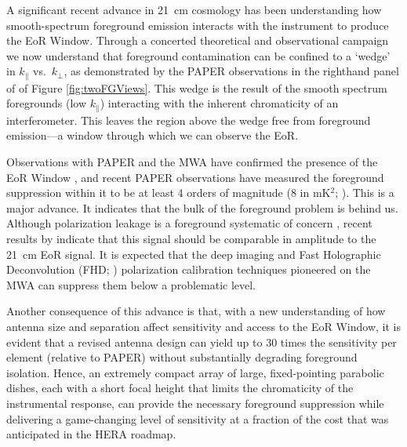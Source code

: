 \documentclass[preprint]{aastex}
\def\kperp{k_{\bot}}
\def\kpar{k_{\|}}
\begin{document}
A significant recent advance in 21~cm cosmology has been understanding how smooth-spectrum
foreground emission interacts with the instrument to produce the EoR Window.
Through a concerted theoretical and observational campaign
\citep{morales_et_al2012,parsons_et_al2012b,vedantham_2012,Datta_2010,hazelton_et_al2013,pober_et_al2013,parsons_et_al2013,dillon_et_al2013b_trunc}
we now understand that foreground contamination can be confined to a `wedge' in
$\kpar$ vs.\ $\kperp$, as demonstrated by the PAPER observations in the
righthand panel of of Figure \ref{fig:twoFGViews}. This wedge is the result of
the smooth spectrum foregrounds (low $\kpar$) interacting with the inherent
chromaticity of an interferometer. 
This leaves the region above the wedge free from 
foreground emission---a window through which we can observe the EoR.

Observations with PAPER and the MWA have confirmed the presence of the EoR Window
\citep{pober_et_al2013,dillon_et_al2013b_trunc}, and recent PAPER observations
have measured the foreground suppression within it
to be at least 4 orders of magnitude (8 in mK$^2$;
\citealt{parsons_et_al2013}).
This is a major advance. 
It indicates that the bulk of the foreground problem
is behind us.  Although polarization leakage is a foreground systematic of 
concern \citep{moore_et_al2013},
recent results by \citet{bernardi_2013_trunc}
indicate that this signal
should be comparable in amplitude to the 21~cm EoR signal. It is 
expected that the deep imaging and Fast Holographic Deconvolution (FHD; \citealt{sullivan_et_al2012_trunc})
polarization calibration techniques pioneered on the MWA
can suppress them below a problematic level.

Another consequence of this advance is that,
with a new understanding of how antenna size and
separation affect sensitivity and access to the EoR Window, it
is evident that a revised antenna design can yield up to 30
times the sensitivity per element (relative to PAPER) without substantially degrading
foreground isolation.  Hence, an extremely compact array of large, fixed-pointing parabolic dishes,
each with a short focal height that limits the chromaticity of the
instrumental response, can provide the necessary foreground suppression
while delivering a game-changing level of sensitivity at a fraction of the
cost that was anticipated in the HERA roadmap.
\end{document}
